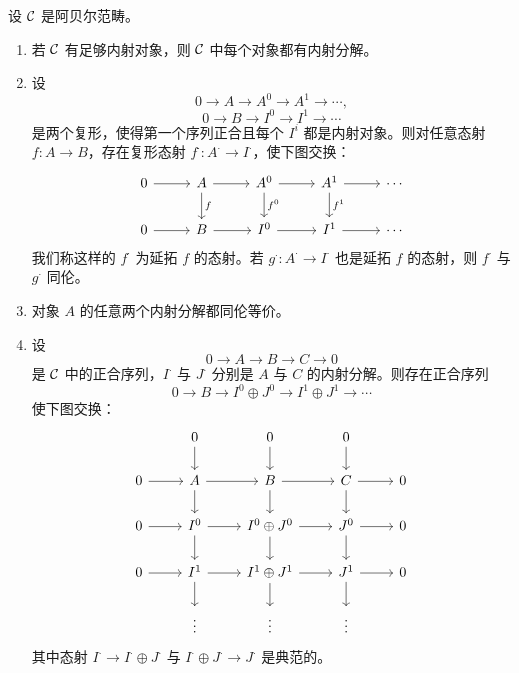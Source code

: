 \begin{proposition}\label{it:2.1.1}
设 $\mathcal{C}$ 是阿贝尔范畴。
\begin{enumerate}[label=(\roman*),leftmargin=2.4em]
  \item 若 $\mathcal{C}$ 有足够内射对象，则 $\mathcal{C}$ 中每个对象都有内射分解。
  \item 设
  \[
  0\to A\to A^0\to A^1\to\cdots,
  \]
  \[
  0\to B\to I^0\to I^1\to\cdots
  \]
  是两个复形，使得第一个序列正合且每个 $I^i$ 都是内射对象。则对任意态射 $f\colon A\to B$，存在复形态射 $f^\cdot\colon A^\cdot\to I^\cdot$，使下图交换：
  \[\begin{tikzcd}[column sep=2.6em,row sep=1.8em]
  0 \arrow[r] & A \arrow[r] \arrow[d,"f"] & A^0 \arrow[r] \arrow[d,"f^0"] & A^1 \arrow[r] \arrow[d,"f^1"] & \cdots \\
  0 \arrow[r] & B \arrow[r] & I^0 \arrow[r] & I^1 \arrow[r] & \cdots
  \end{tikzcd}\]
  我们称这样的 $f^\cdot$ 为延拓 $f$ 的态射。若 $g^\cdot\colon A^\cdot\to I^\cdot$ 也是延拓 $f$ 的态射，则 $f^\cdot$ 与 $g^\cdot$ 同伦。
  \item 对象 $A$ 的任意两个内射分解都同伦等价。
  \item 设
  \[
  0\to A\to B\to C\to 0
  \]
  是 $\mathcal{C}$ 中的正合序列，$I^\cdot$ 与 $J^\cdot$ 分别是 $A$ 与 $C$ 的内射分解。则存在正合序列
  \[
  0\to B\to I^0\oplus J^0\to I^1\oplus J^1\to\cdots
  \]
  使下图交换：
  \[\begin{tikzcd}[column sep=2.4em,row sep=1.7em]
  & 0 \arrow[d] & 0 \arrow[d] & 0 \arrow[d] & \\
  0 \arrow[r] & A \arrow[r] \arrow[d] & B \arrow[r] \arrow[d] & C \arrow[r] \arrow[d] & 0 \\
  0 \arrow[r] & I^0 \arrow[r] \arrow[d] & I^0\oplus J^0 \arrow[r] \arrow[d] & J^0 \arrow[r] \arrow[d] & 0 \\
  0 \arrow[r] & I^1 \arrow[r] \arrow[d] & I^1\oplus J^1 \arrow[r] \arrow[d] & J^1 \arrow[r] \arrow[d] & 0 \\
  & \vdots & \vdots & \vdots &
  \end{tikzcd}\]
  其中态射 $I^\cdot\to I^\cdot\oplus J^\cdot$ 与 $I^\cdot\oplus J^\cdot\to J^\cdot$ 是典范的。
\end{enumerate}
\end{proposition}

